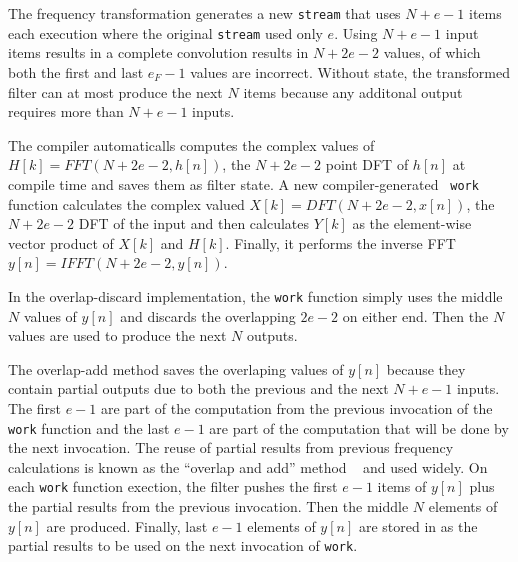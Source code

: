 The frequency transformation generates a new {\tt stream} that
uses $N+e-1$ items each execution where the original {\tt stream} used only $e$.
Using $N+e-1$ input items results in a complete convolution results in 
$N+2e-2$ values, of which both the first and last $e_F-1$ values 
are incorrect. Without state, the transformed filter can at most produce 
the next $N$ items because any additonal output requires more than $N+e-1$ inputs.

The compiler automaticalls computes the complex values of
$H[k]=FFT(N+2e-2,h[n])$, the $N+2e-2$ point DFT of $h[n]$ at compile
time and saves them as filter state.  A new compiler-generated {\tt
work} function calculates the complex valued $X[k]=DFT(N+2e-2,x[n])$,
the $N+2e-2$ DFT of the input and then calculates $Y[k]$ as the
element-wise vector product of $X[k]$ and $H[k]$. Finally, it performs
the inverse FFT $y[n]=IFFT(N+2e-2,y[n])$.

In the overlap-discard implementation, the {\tt work} function simply
uses the middle $N$ values of $y[n]$ and discards the overlapping
$2e-2$ on either end. Then the $N$ values are used to produce the next
$N$ outputs.

The overlap-add method saves the overlaping values of $y[n]$ because they contain partial
outputs due to both the previous and the next $N+e-1$ inputs.
The first $e-1$ are part of the computation from the previous invocation of the 
{\tt work} function and the last $e-1$ are part of the computation that will be done
by the next invocation. 
The reuse of partial results from previous frequency calculations is known 
as the ``overlap and add'' method ~\cite{oppenheim-discrete} and used widely.
On each {\tt work} function exection, the filter pushes the first $e-1$ items 
of $y[n]$ plus the partial results from the previous invocation. Then the middle 
$N$ elements of $y[n]$ are produced. Finally, last $e-1$ elements 
of $y[n]$ are stored in as the partial results to be used on the next 
invocation of {\tt work}.

